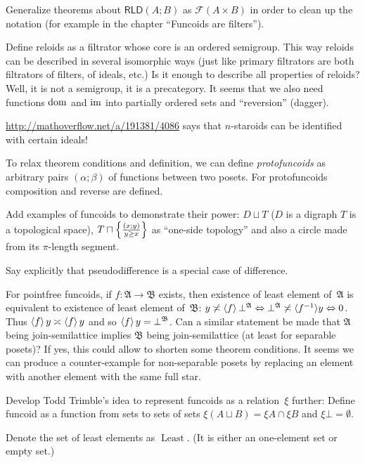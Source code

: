 \documentclass{amsart}
\begin{document}
Generalize theorems about $\mathsf{RLD}(A;B)$ as $\mathscr{F}(A\times B)$ in order to clean up the notation
(for example in the chapter ``Funcoids are filters'').

Define reloids as a filtrator whose core is an ordered semigroup.
This way reloids can be described in several isomorphic ways (just like primary filtrators are both filtrators of filters, of ideals, etc.)
Is it enough to describe all properties of reloids? Well, it is not a semigroup, it is a precategory.
It seems that we also need functions $\operatorname{dom}$ and $\operatorname{im}$ into partially ordered sets and ``reversion'' (dagger).

\url{http://mathoverflow.net/a/191381/4086} says that $n$-staroids can be identified with certain ideals!

To relax theorem conditions and definition, we can define \emph{protofuncoids} as arbitrary pairs $(\alpha;\beta)$ of functions
between two posets. For protofuncoids composition and reverse are defined.

Add examples of funcoids to demonstrate their power:
$D\sqcup T$ ($D$ is a digraph $T$ is a topological space),
$T\sqcap\left\{ \frac{(x;y)}{y\ge x}\right\}$ as ``one-side topology'' and also a circle made from its $\pi$-length segment.

Say explicitly that pseudodifference is a special case of difference.

For pointfree funcoids, if $f:\mathfrak{A}\rightarrow\mathfrak{B}$ exists,
then existence of least element of~$\mathfrak{A}$ is equivalent to existence of least element of~$\mathfrak{B}$:
$y \not\asymp \left\langle f\right\rangle \bot^{\mathfrak{A}} \Leftrightarrow
\bot^{\mathfrak{A}} \not\asymp \langle f^{- 1} \rangle y \Leftrightarrow 0$. Thus
$\left\langle f\right\rangle y \asymp \left\langle f\right\rangle y$ and so $\left\langle f\right\rangle y =
\bot^{\mathfrak{B}}$.
Can a similar statement be made that $\mathfrak{A}$ being join-semilattice implies $\mathfrak{B}$ being join-semilattice
(at least for separable posets)? If yes, this could allow to shorten some theorem conditions.
It seems we can produce a counter-example for non-separable posets by replacing an element with another element with the same full star.

Develop Todd Trimble's idea to represent funcoids as a relation~$\xi$ further:
Define funcoid as a function from sets to sets of sets
$\xi(A\sqcup B) = \xi A\cap\xi B$ and $\xi\bot=\emptyset$.

Denote the set of least elements as $\operatorname{Least}$. (It is either an
one-element set or empty set.)
\end{document}
